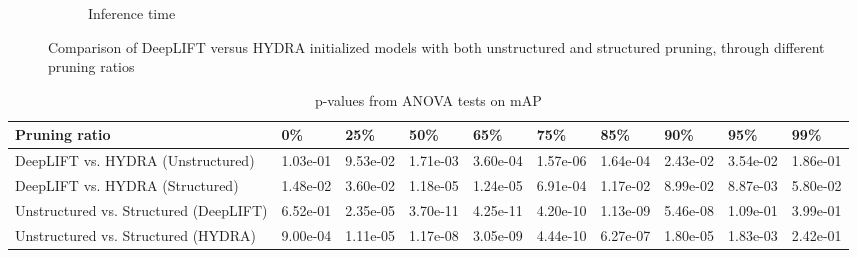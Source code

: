 \documentclass[journal,onecolumn,12pt]{IEEEtran}
\begin{document}
\begin{figure}
\begin{subfigure}[b]{.5\textwidth}
      \caption{Inference time}
      \label{fig:time1}
    \end{subfigure}
    \caption{Comparison of DeepLIFT versus HYDRA initialized models with both unstructured and structured pruning, through different pruning ratios}
    \label{fig:result1}
\end{figure}

\begin{table}[htbp]
    \caption{p-values from ANOVA tests on mAP}
    \begin{center}
    \begin{tabular}{ |p{3cm}|p{1.2cm}|p{1.2cm}|p{1.2cm}|p{1.2cm}|p{1.2cm}|p{1.2cm}|p{1.2cm}|p{1.2cm}|p{1.2cm}|  }
     \hline
     Pruning ratio  & 0\% & 25\%& 50\%& 65\%& 75\%& 85\%& 90\%& 95\%& 99\%\\
     \hline
     DeepLIFT vs. HYDRA (Unstructured)    & 1.03e-01& 9.53e-02& 1.71e-03& 3.60e-04& 1.57e-06& 1.64e-04& 2.43e-02& 3.54e-02& 1.86e-01 \\
     DeepLIFT vs. HYDRA (Structured)     & 1.48e-02& 3.60e-02& 1.18e-05& 1.24e-05& 6.91e-04& 1.17e-02& 8.99e-02& 8.87e-03& 5.80e-02\\
     \hline
     Unstructured vs. Structured (DeepLIFT)      & 6.52e-01& 2.35e-05& 3.70e-11& 4.25e-11&4.20e-10& 1.13e-09& 5.46e-08& 1.09e-01&3.99e-01 \\
     Unstructured vs. Structured (HYDRA)    & 9.00e-04& 1.11e-05& 1.17e-08& 3.05e-09&4.44e-10& 6.27e-07& 1.80e-05& 1.83e-03&2.42e-01\\
     \hline
    \end{tabular}
    \end{center}
    \label{tab:p-mAP}
\end{table}
\end{document}
